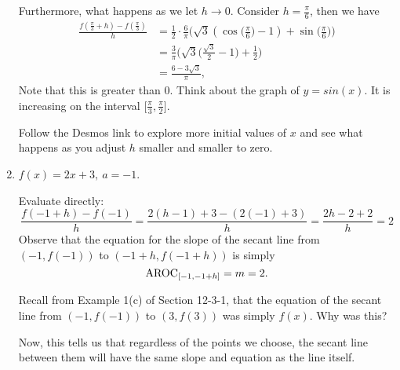 \documentclass{ximera}
\begin{document}
\begin{example}
\begin{enumerate}[label=\alph*.]
\begin{explanation}
 Furthermore, what happens as we let $h \rightarrow 0$. Consider $h =\frac{\pi}{6}$, then we have 
  \begin{align*}
   \frac{f(\frac{\pi}{3} + h) - f(\frac{\pi}{3})}{h} &= \frac{1}{2} \cdot \frac{6}{\pi}\big(\sqrt{3}(\cos\Big(\frac{\pi}{6}\Big) -1) + \sin\Big(\frac{\pi}{6}\Big)\big)\\
   &= \frac{3}{\pi}\Big(\sqrt{3}\Big(\frac{\sqrt{3}}{2} -1\Big)+ \frac{1}{2}\Big)\\
   &=\frac{6-3\sqrt{3}}{\pi},
   \end{align*}
   Note that this is greater than 0. Think about the graph of $y=sin(x)$. It is increasing on the interval $\big[\frac{\pi}{3}, \frac{\pi}{2}\big]$.
   
   Follow the Desmos link to explore more initial values of $x$ and see what happens as you adjust $h$ smaller and smaller to zero.

    \end{explanation}
  
  \item $f(x) = 2x+3, \ a = -1$.\\
  \begin{explanation}
  Evaluate directly:
  \begin{equation*}
  \frac{f(-1 + h) - f(-1)}{h} = \frac{2(h-1) + 3 - (2(-1)+3)}{h} = \frac{2h-2 +2}{h} = 2 
  \end{equation*}
  Observe that the equation for the slope of the secant line from $(-1,f(-1))$ to $(-1+h,f(-1+h))$ is simply
  $$\mathrm{AROC}_{[-1,-1+h]}=  m = 2.$$
  
 Recall from Example 1(c) of Section 12-3-1, that the equation of the secant line from $(-1,f(-1))$ to $(3,f(3))$ was simply $f(x)$. Why was this?
  
Now, this tells us that regardless of the points we choose, the secant line between them will have the same slope and equation as the line itself.
  \end{explanation}
   \end{enumerate}
\end{example}
\end{document}
